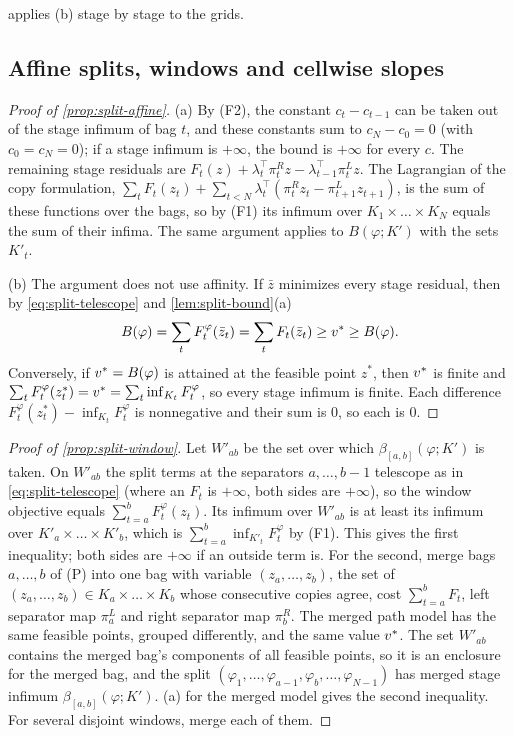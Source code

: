  applies (b) stage by stage to the  grids.

\subsection{Affine splits, windows and cellwise slopes}\label{app:splitproofs-affine}

\begin{proof}[Proof of \cref{prop:split-affine}]
(a) By (F2), the constant $c_t-c_{t-1}$ can be taken out of the stage infimum
of bag $t$, and these constants sum to $c_N-c_0=0$ (with $c_0=c_N=0$); if a
stage infimum is $+\infty$, the bound is $+\infty$ for every $c$.
The remaining stage residuals are
$F_t(z)+\lambda_t^\top\pi^R_tz-\lambda_{t-1}^\top\pi^L_tz$.
The Lagrangian of the copy formulation,
$\sum_tF_t(z_t)+\sum_{t<N}\lambda_t^\top(\pi^R_tz_t-\pi^L_{t+1}z_{t+1})$, is the
sum of these functions over the bags, so by (F1) its infimum over
$K_1\times\dots\times K_N$ equals the sum of their infima.
The same argument applies to $B(\varphi;K')$ with the sets $K'_t$.

(b) The argument does not use affinity.
If $\bar z$ minimizes every stage residual, then by
\eqref{eq:split-telescope} and \cref{lem:split-bound}(a)
\[
  B(\varphi)=\sum_tF^\varphi_t(\bar z_t)=\sum_tF_t(\bar z_t)\ge v^{*}\ge B(\varphi).
\]
Conversely, if $v^{*}=B(\varphi)$ is attained at the feasible point $z^*$,
then $v^{*}$ is finite and
$\sum_tF^\varphi_t(z^*_t)=v^{*}=\sum_t\inf_{K_t}F^\varphi_t$, so every stage
infimum is finite.
Each difference $F^\varphi_t(z^*_t)-\inf_{K_t}F^\varphi_t$ is nonnegative and
their sum is $0$, so each is $0$.
\end{proof}

\begin{proof}[Proof of \cref{prop:split-window}]
Let $W'_{ab}$ be the set over which $\beta_{[a,b]}(\varphi;K')$ is taken.
On $W'_{ab}$ the split terms at the separators $a,\dots,b-1$ telescope as in
\eqref{eq:split-telescope} (where an $F_t$ is $+\infty$, both sides are
$+\infty$), so the window objective equals $\sum_{t=a}^bF^\varphi_t(z_t)$.
Its infimum over $W'_{ab}$ is at least its infimum over
$K'_a\times\dots\times K'_b$, which is $\sum_{t=a}^b\inf_{K'_t}F^\varphi_t$ by
(F1).
This gives the first inequality; both sides are $+\infty$ if an outside term
is.
For the second, merge bags $a,\dots,b$ of (P) into one bag with variable
$(z_a,\dots,z_b)$, the set of $(z_a,\dots,z_b)\in K_a\times\dots\times K_b$
whose consecutive copies agree, cost $\sum_{t=a}^bF_t$, left separator map
$\pi^L_a$ and right separator map $\pi^R_b$.
The merged path model has the same feasible points, grouped differently, and
the same value $v^{*}$.
The set $W'_{ab}$ contains the merged bag's components of all feasible points,
so it is an enclosure for the merged bag, and the split
$(\varphi_1,\dots,\varphi_{a-1},\varphi_b,\dots,\varphi_{N-1})$ has merged
stage infimum $\beta_{[a,b]}(\varphi;K')$.
(a) for the merged model gives the second inequality.
For several disjoint windows, merge each of them.
\end{proof}

